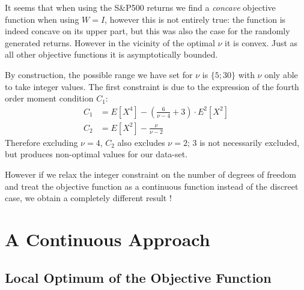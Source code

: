 It seems that when using the S\&P500 returns we find a \emph{concave} objective function when using $W=I$, however this is not entirely true: the function is indeed concave on its upper part, but this was also the case for the randomly generated returns. However in the vicinity of the optimal $\nu$ it is convex. Just as all other objective functions it is asymptotically bounded. \smallskip
\par
By construction, the possible range we have set for $\nu$ is $\{5;30\}$ with $\nu$ only able to take integer values. The first constraint is due to the expression of the fourth order moment condition $C_1$:
\begin{align*}
    C_1 &= E\left[X^4\right] - \left(\frac{6}{\nu-4}+3\right)\cdot E^2\left[X^2\right] \\
    C_2 &= E\left[X^2\right] - \frac{\nu}{\nu - 2}
\end{align*}
Therefore excluding $\nu = 4$, $C_2$ also excludes $\nu=2$; $3$ is not necessarily excluded, but produces non-optimal values for our data-set.
\smallskip\par
However if we relax the integer constraint on the number of degrees of freedom and treat the objective function as a continuous function instead of the discreet case, we obtain a completely different result !


\section{A Continuous Approach}

\subsection{Local Optimum of the Objective Function}


